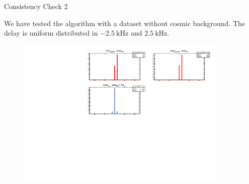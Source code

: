 \documentclass[9pt]{beamer}
\begin{document}
\begin{frame}{Consistency Check 2}

We have tested the algorithm with a dataset without cosmic background. The delay is uniform distributed in $\SI{-2.5}{\kilo \hertz}$ and $\SI{+2.5}{\kilo \hertz}$.

\begin{figure}
\includegraphics[width = 0.9\textwidth]{../Plot/OnsetResult7.pdf}
\end{figure} 
\end{frame}
\end{document}
